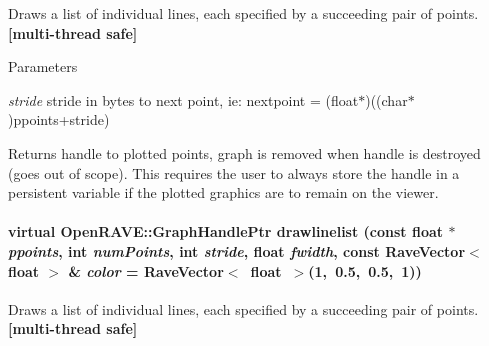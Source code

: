 Draws a list of individual lines, each specified by a succeeding pair of points. {\bfseries \mbox{[}multi-\/thread safe\mbox{]}} 


\begin{DoxyParams}{Parameters}
\item[{\em stride}]stride in bytes to next point, ie: nextpoint = (float$\ast$)((char$\ast$)ppoints+stride) \end{DoxyParams}
\begin{DoxyReturn}{Returns}
handle to plotted points, graph is removed when handle is destroyed (goes out of scope). This requires the user to always store the handle in a persistent variable if the plotted graphics are to remain on the viewer. 
\end{DoxyReturn}
\hypertarget{classOpenRAVE_1_1EnvironmentBase_a4ad6149f9edca071a45a8d05f5713ecb}{
\paragraph[{drawlinelist}]{\setlength{\rightskip}{0pt plus 5cm}virtual OpenRAVE::GraphHandlePtr drawlinelist (const float $\ast$ {\em ppoints}, \/  int {\em numPoints}, \/  int {\em stride}, \/  float {\em fwidth}, \/  const RaveVector$<$ float $>$ \& {\em color} = {\ttfamily RaveVector$<$~float~$>$(1,~0.5,~0.5,~1)})}\hfill}
\label{classOpenRAVE_1_1EnvironmentBase_a4ad6149f9edca071a45a8d05f5713ecb}


Draws a list of individual lines, each specified by a succeeding pair of points. {\bfseries \mbox{[}multi-\/thread safe\mbox{]}} 


